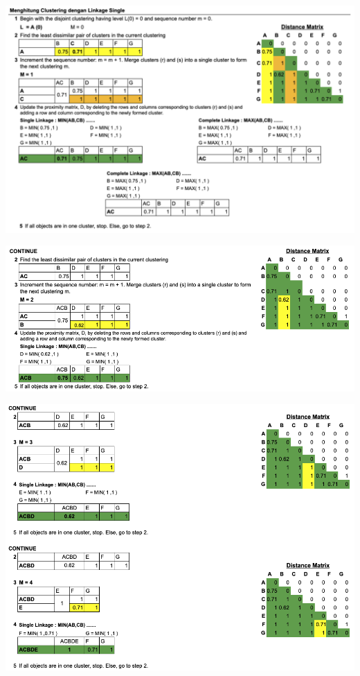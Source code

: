 \begin{center}
	\includegraphics[width=14cm]{img/bab_3/hc_detail_1.png}
	\label{fig:hc_detail_1}
\end{center}

\begin{center}
	\includegraphics[width=14cm]{img/bab_3/hc_detail_2.png}
	\label{fig:hc_detail_2}
\end{center}

\begin{center}
	\includegraphics[width=14cm]{img/bab_3/hc_detail_3.png}
	\label{fig:hc_detail_3}
\end{center}

